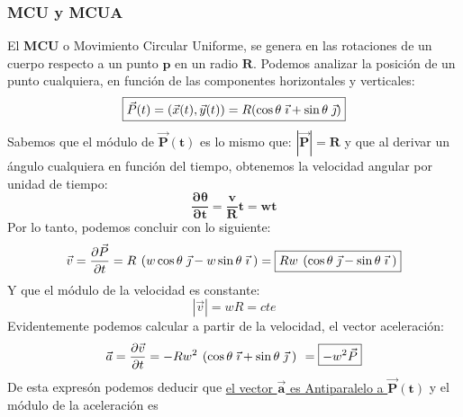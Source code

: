\subsubsection{MCU y MCUA}
\begin{wrapfigure}{1}{6cm}
        \hspace{0.2cm}
        
        \par
\end{wrapfigure}
\noindent El \textbf{MCU} o Movimiento Circular Uniforme, se genera en las rotaciones de un cuerpo respecto a un punto \(\bm{p}\) en un radio \(\bm{R}\).
Podemos analizar la posición de un punto cualquiera, en función de las componentes horizontales y verticales:
\[
        \boxed{\vec{P}(t)=(\vec{x}(t),\vec{y}(t))=R(\cos{\theta}\hspace{1mm}\vec{\imath} + \sin{\theta}\hspace{1mm}\vec{\jmath})}
\]
Sabemos que el módulo de \(\bm{\vec{P}(t)}\) es lo mismo que: \(\bm{\left | \vec{P} \right | = R}\) y que al derivar un ángulo cualquiera en función del tiempo, obtenemos la velocidad angular por unidad de tiempo:
\[
        \boxed{\bm{\frac{\partial \theta}{\partial t} = \frac{v}{R}t = wt}}
\]
Por lo tanto, podemos concluir con lo siguiente:
\[
        \vec{v} =\frac{\partial \vec{P}}{\partial t} =R \hspace{1.35mm} (w\cos{\theta}\hspace{1mm}\vec{\jmath} - w\sin{\theta}\hspace{1mm}\vec{\imath}\hspace{1mm})  =\boxed{Rw \hspace{1.35mm} (\cos{\theta}\hspace{1mm}\vec{\jmath} - \sin{\theta}\hspace{1mm}\vec{\imath}\hspace{1mm})}
\]
Y que el módulo de la velocidad es constante:
\[
        \left | \vec{v} \right | = wR = cte
\]
Evidentemente podemos calcular a partir de la velocidad, el vector aceleración:
\[
        \vec{a} =\frac{\partial \vec{v}}{\partial t} = -Rw^2 \hspace{1.35mm}(\cos{\theta}\hspace{1mm}\vec{\imath} + \sin{\theta}\hspace{1mm}\vec{\jmath}\hspace{1mm}) \hspace{1.35mm}= \boxed{-w^{2}\vec{P}}
\]
De esta expresón podemos deducir que \underline{el vector \(\bm{\vec{a}}\) es Antiparalelo a \(\bm{\vec{P}(t)}\)} y el módulo de la aceleración es 
